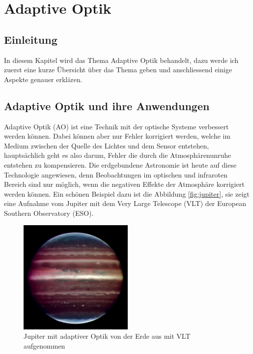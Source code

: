 \chapter{Adaptive Optik\label{chapter:thema}}
\begin{refsection}

\section{Einleitung}
In diesem Kapitel wird das Thema Adaptive Optik behandelt, dazu werde ich zuerst eine kurze Übersicht über das Thema geben und anschliessend einige Aspekte genauer erklären. \newline

\section{Adaptive Optik und ihre Anwendungen}
Adaptive Optik (AO) ist eine Technik mit der optische Systeme verbessert werden können. Dabei können aber nur Fehler korrigiert werden, welche im Medium zwischen der Quelle des Lichtes und dem Sensor entstehen, hauptsächlich geht es also darum, Fehler die durch die Atmosphärenunruhe entstehen zu kompensieren. Die erdgebundene Astronomie ist heute auf diese Technologie angewiesen, denn Beobachtungen im optischen und infraroten Bereich sind nur möglich, wenn die negativen Effekte der Atmosphäre korrigiert werden können. Ein schönen Beispiel dazu ist die Abbildung \ref{fig:jupiter}, sie zeigt eine Aufnahme vom Jupiter mit dem Very Large Telescope (VLT) der European Southern Observatory (ESO).
\begin{figure}
  \centering
  \includegraphics[width=0.5\textwidth]{adaptiv/images/Jupiter_adaptiv}
  \caption{Jupiter mit adaptiver Optik von der Erde aus mit VLT aufgenommen
    \cite{eso:jupiter}}

\end{figure}
\end{refsection}
